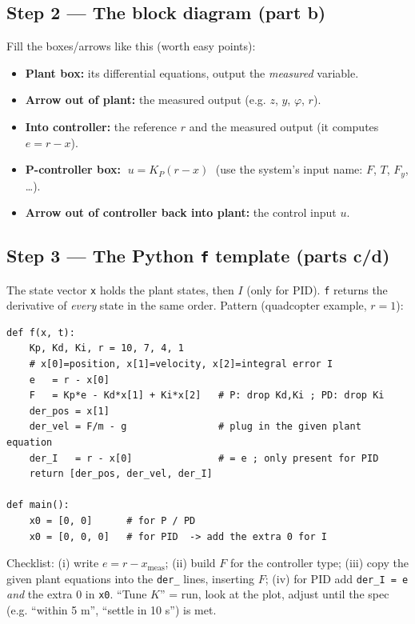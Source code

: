 \subsection*{Step 2 --- The block diagram (part b)}
Fill the boxes/arrows like this (worth easy points):
\begin{itemize}
  \item \textbf{Plant box:} its differential equations, output the \emph{measured} variable.
  \item \textbf{Arrow out of plant:} the measured output (e.g. $z$, $y$, $\varphi$, $r$).
  \item \textbf{Into controller:} the reference $r$ and the measured output (it computes $e=r-x$).
  \item \textbf{P-controller box:} $\;u = K_P(r - x)\;$ (use the system's input name: $F$, $T$, $F_y$, \dots).
  \item \textbf{Arrow out of controller back into plant:} the control input $u$.
\end{itemize}

\subsection*{Step 3 --- The Python \texttt{f} template (parts c/d)}
The state vector \texttt{x} holds the plant states, then $I$ (only for PID). \texttt{f} returns the
derivative of \emph{every} state in the same order. Pattern (quadcopter example, $r=1$):
\begin{verbatim}
def f(x, t):
    Kp, Kd, Ki, r = 10, 7, 4, 1
    # x[0]=position, x[1]=velocity, x[2]=integral error I
    e   = r - x[0]
    F   = Kp*e - Kd*x[1] + Ki*x[2]   # P: drop Kd,Ki ; PD: drop Ki
    der_pos = x[1]
    der_vel = F/m - g                # plug in the given plant equation
    der_I   = r - x[0]               # = e ; only present for PID
    return [der_pos, der_vel, der_I]

def main():
    x0 = [0, 0]      # for P / PD
    x0 = [0, 0, 0]   # for PID  -> add the extra 0 for I
\end{verbatim}
Checklist: (i) write $e=r-x_{\text{meas}}$; (ii) build $F$ for the controller type; (iii) copy the
given plant equations into the \texttt{der\_} lines, inserting $F$; (iv) for PID add \texttt{der\_I = e}
\emph{and} the extra $0$ in \texttt{x0}. ``Tune $K$'' = run, look at the plot, adjust until the spec
(e.g. ``within 5 m'', ``settle in 10 s'') is met.

